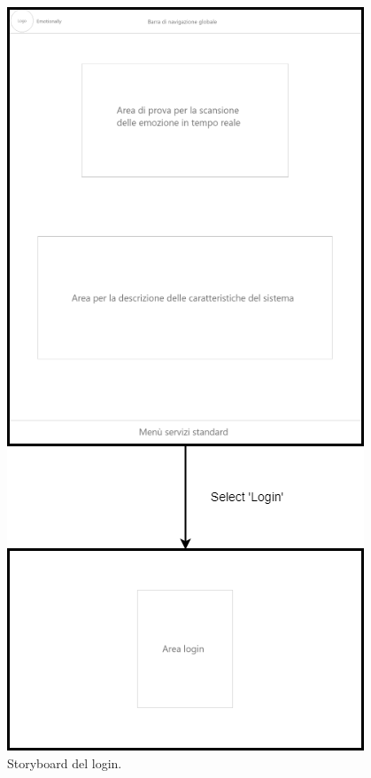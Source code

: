 
\begin{figure}[H]
	\centering
	\caption{Storyboard del login.}
	\label{fig:storyboard:login}
	\includegraphics[height=\textheight-3ex]{images/storyboard/login}
\end{figure}

